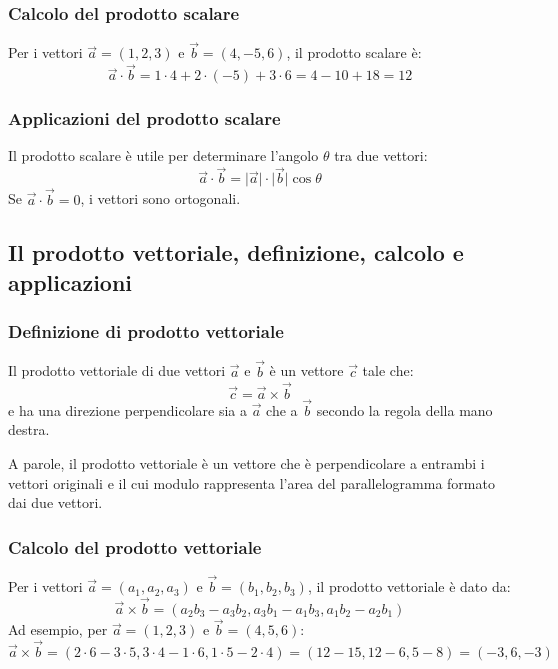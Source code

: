 \documentclass{article}
\begin{document}
\subsubsection{Calcolo del prodotto scalare}
Per i vettori \(\vec{a} = (1, 2, 3)\) e \(\vec{b} = (4, -5, 6)\), il prodotto scalare è:
\[
    \vec{a} \cdot \vec{b} = 1 \cdot 4 + 2 \cdot (-5) + 3 \cdot 6 = 4 - 10 + 18 = 12
\]

\subsubsection{Applicazioni del prodotto scalare}
Il prodotto scalare è utile per determinare l'angolo \(\theta\) tra due vettori:
\[
    \vec{a} \cdot \vec{b} = \lvert\vec{a}\rvert \cdot \lvert\vec{b}\rvert \cos \theta
\]
Se \(\vec{a} \cdot \vec{b} = 0\), i vettori sono ortogonali.


\newpage
\subsection{Il prodotto vettoriale, definizione, calcolo e applicazioni}

\subsubsection{Definizione di prodotto vettoriale}
Il prodotto vettoriale di due vettori \(\vec{a}\) e \(\vec{b}\) è un vettore \(\vec{c}\)
tale che:
\[
    \vec{c} = \vec{a} \times \vec{b}
\]
e ha una direzione perpendicolare sia a \(\vec{a}\) che a \(\vec{b}\) secondo la regola
della mano destra.

A parole, il prodotto vettoriale è un vettore che è perpendicolare a entrambi i vettori
originali e il cui modulo rappresenta l'area del parallelogramma formato dai due vettori.

\subsubsection{Calcolo del prodotto vettoriale}
Per i vettori \(\vec{a} = (a_1, a_2, a_3)\) e \(\vec{b} = (b_1, b_2, b_3)\),
il prodotto vettoriale è dato da:
\[
    \vec{a} \times \vec{b} = (a_2 b_3 - a_3 b_2, a_3 b_1 - a_1 b_3, a_1 b_2 - a_2 b_1)
\]
Ad esempio, per \(\vec{a} = (1, 2, 3)\) e \(\vec{b} = (4, 5, 6)\):
\[
    \vec{a} \times \vec{b} = (2 \cdot 6 - 3 \cdot 5, 3 \cdot 4 - 1 \cdot 6, 1 \cdot 5 - 2 \cdot 4) = (12 - 15, 12 - 6, 5 - 8) = (-3, 6, -3)
\]
\end{document}
